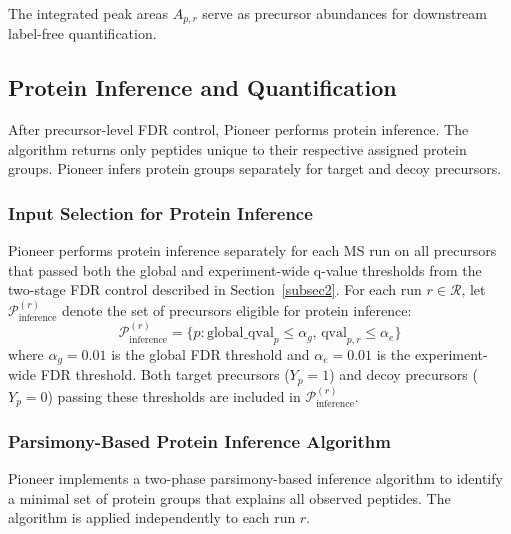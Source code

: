 \documentclass[pdflatex,sn-nature]{sn-jnl}
\begin{document}
The integrated peak areas $A_{p,r}$ serve as precursor abundances for downstream label-free quantification.


\subsection{Protein Inference and Quantification}\label{subsec:protein_inference}

After precursor-level FDR control, Pioneer performs protein inference. The algorithm returns only peptides unique to their respective assigned protein groups. Pioneer infers protein groups separately for target and decoy precursors.

\subsubsection{Input Selection for Protein Inference}

Pioneer performs protein inference separately for each MS run on all precursors that passed both the global and experiment-wide q-value thresholds from the two-stage FDR control described in Section~\ref{subsec2}. For each run $r \in \mathcal{R}$, let $\mathcal{P}_{\text{inference}}^{(r)}$ denote the set of precursors eligible for protein inference:
\begin{equation}
\mathcal{P}_{\text{inference}}^{(r)} = \{p : \text{global\_qval}_p \leq \alpha_g, \, \text{qval}_{p,r} \leq \alpha_e\}
\end{equation}
where $\alpha_g = 0.01$ is the global FDR threshold and $\alpha_e = 0.01$ is the experiment-wide FDR threshold. Both target precursors ($Y_p = 1$) and decoy precursors ($Y_p = 0$) passing these thresholds are included in $\mathcal{P}_{\text{inference}}^{(r)}$.

\subsubsection{Parsimony-Based Protein Inference Algorithm}

Pioneer implements a two-phase parsimony-based inference algorithm \cite{Nesvizhskii2005,Zhang2007} to identify a minimal set of protein groups that explains all observed peptides. The algorithm is applied independently to each run $r$.
\end{document}
